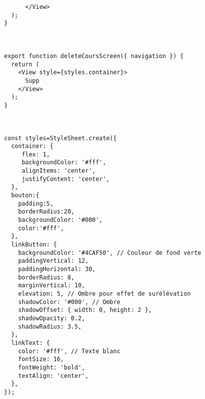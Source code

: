 \documentclass[10pt,a4paper]{article}
\begin{document}
\begin{verbatim}
        </View>
    );
  }



  export function deleteCoursScreen({ navigation }) {
    return (
      <View style={styles.container}>
        Supp
      </View>
    );
  }
 


  const styles=StyleSheet.create({
    container: {
       flex: 1,
       backgroundColor: '#fff',
       alignItems: 'center',
       justifyContent: 'center',
    },
    bouton:{
      padding:5,
      borderRadius:20,
      backgroundColor: '#000',
      color:'#fff',
    },
    linkButton: {
      backgroundColor: '#4CAF50', // Couleur de fond verte
      paddingVertical: 12,
      paddingHorizontal: 30,
      borderRadius: 8,
      marginVertical: 10,
      elevation: 5, // Ombre pour effet de surélévation
      shadowColor: '#000', // Ombre
      shadowOffset: { width: 0, height: 2 },
      shadowOpacity: 0.2,
      shadowRadius: 3.5,
    },
    linkText: {
      color: '#fff', // Texte blanc
      fontSize: 16,
      fontWeight: 'bold',
      textAlign: 'center',
    },
  });
\end{verbatim}
\end{document}
